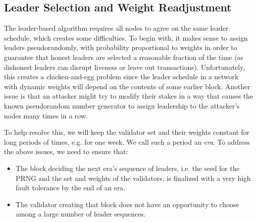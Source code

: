 \documentclass[12pt]{article}
\newtheorem{proposition}{Proposition}
\begin{document}
% 
% 
% 


\subsection{Leader Selection and Weight Readjustment}

The leader-based algorithm requires all nodes to agree on the same leader schedule, which creates some difficulties. To begin with, it makes sense to assign leaders pseudorandomly, with probability proportional to weights in order to guarantee that honest leaders are selected a reasonable fraction of the time (as dishonest leaders can disrupt liveness or leave out transactions). Unfortunately, this creates a chicken-and-egg problem since the leader schedule in a network with dynamic weights will depend on the contents of some earlier block. Another issue is that an attacker might try to modify their stakes in a way that causes the known pseudorandom number generator to assign leadership to the attacker's nodes many times in a row.

To help resolve this, we will keep the validator set and their weights constant for long periods of times, e.g. for one week. We call such a period an \emph{era}. To address the above issues, we need to ensure that:
\begin{itemize}
  \item The block deciding the next era's sequence of leaders, i.e. the seed for the PRNG and the set and weights of the validators, is finalized with a very high fault tolerance by the end of an era.
  \item The validator creating that block does not have an opportunity to choose among a large number of leader sequences.
\end{itemize}
\end{document}
